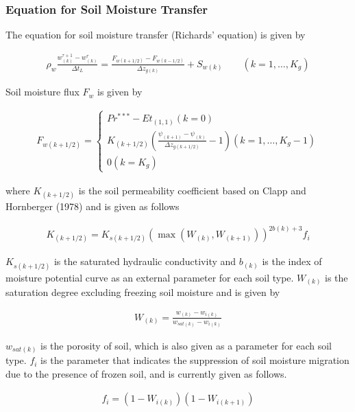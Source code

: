 \hypertarget{equation-for-soil-moisture-transfer}{%
\subsubsection{Equation for Soil Moisture
Transfer}\label{equation-for-soil-moisture-transfer}}

The equation for soil moisture transfer (Richards' equation) is given by

\begin{eqnarray}
\rho_w \frac{w_{(k)}^{\tau+1} - w_{(k)}^{\tau}}{\Delta t_L} =
\frac{F_{w(k+1/2)} - F_{w(k-1/2)}}{\Delta z_{g(k)}} + S_{w(k)}
\qquad (k=1,\ldots,K_{g})
\end{eqnarray}

Soil moisture flux \(F_{w}\) is given by

\begin{eqnarray}
 F_{w(k+1/2)} =
\left\{
\begin{array}{ll}
Pr^{***} - Et_{(1,1)}
 (k=0)\\
\displaystyle{
K_{(k+1/2)} \left(\frac{\psi_{(k+1)} - \psi_{(k)}}{\Delta z_{g(k+1/2)}} - 1 \right)
}
 (k=1,\ldots,K_{g}-1) \\
\displaystyle{
0
}
 (k=K_{g})
\end{array}
\right.
\end{eqnarray}

where \(K_{(k+1/2)}\) is the soil permeability coefficient based on
Clapp and Hornberger (1978) and is given as follows

\begin{eqnarray}
 K_{(k+1/2)} = K_{s(k+1/2)} (\max(W_{(k)},W_{(k+1)}))^{2b(k)+3} f_i
\end{eqnarray}

\(K_{s(k+1/2)}\) is the saturated hydraulic conductivity and \(b_{(k)}\)
is the index of moisture potential curve as an external parameter for
each soil type. \(W_{(k)}\) is the saturation degree excluding freezing
soil moisture and is given by

\begin{eqnarray}
 W_{(k)} = \frac{w_{(k)}-w_{i(k)}}{w_{sat(k)}-w_{i(k)}}
\end{eqnarray}

\(w_{sat(k)}\) is the porosity of soil, which is also given as a
parameter for each soil type. \(f_i\) is the parameter that indicates
the suppression of soil moisture migration due to the presence of frozen
soil, and is currently given as follows.

\begin{eqnarray}
 f_i = \left(1- W_{i(k)}\right)
       \left(1- W_{i(k+1)}\right)
\end{eqnarray}

